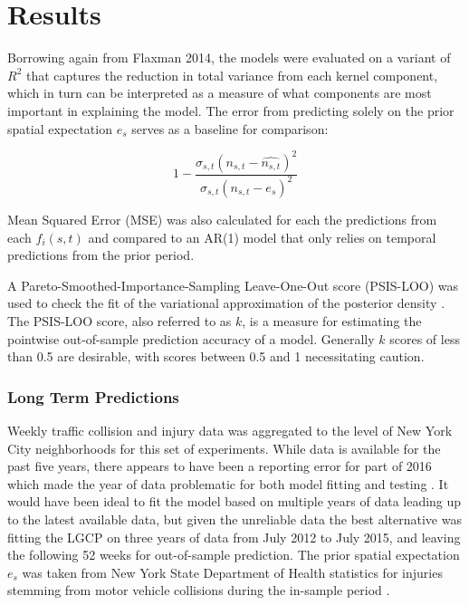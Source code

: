 \chapter{Results}
\label{results}

Borrowing again from Flaxman 2014, the models were evaluated on a variant of $R^2$ that captures the reduction in total variance from each kernel component, which in turn can be interpreted as a measure of what components are most important in explaining the model. The error from predicting solely on the prior spatial expectation $e_s$ serves as a baseline for comparison:

$$ 1 - \frac{\sigma_{s,t}(n_{s,t}- \hat{n_{s,t}})^2}{\sigma_{s,t}(n_{s,t} - e_{s})^2}$$

Mean Squared Error (MSE) was also calculated for each the predictions from each $f_i(s,t)$ and compared to an AR(1) model that only relies on temporal predictions from the prior period. \par

A Pareto-Smoothed-Importance-Sampling Leave-One-Out score (PSIS-LOO) was used to check the fit of the variational approximation of the posterior density \cite{vehtari_loo}. The PSIS-LOO score, also referred to as $k$, is a measure for estimating the pointwise out-of-sample prediction accuracy of a model. Generally $k$ scores of less than 0.5 are desirable, with scores between 0.5 and 1 necessitating caution.


\subsection{Long Term Predictions}

 Weekly traffic collision and injury data was aggregated to the level of New York City neighborhoods for this set of experiments. While data is available for the past five years, there appears to have been a reporting error for part of 2016 which made the year of data problematic for both model fitting and testing . It would have been ideal to fit the model based on multiple years of data leading up to the latest available data, but given the unreliable data the best alternative was fitting the LGCP on three years of data from July 2012 to July 2015, and leaving the following 52 weeks for out-of-sample prediction. The prior spatial expectation $e_s$ was taken from New York State Department of Health statistics for injuries stemming from motor vehicle collisions during the in-sample period \cite{nys_crash_stats}. \par

